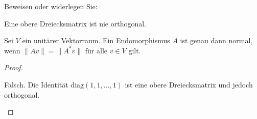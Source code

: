 \begin{Problem}
	Beweisen oder widerlegen Sie:
	\begin{parts}
	\item Eine obere Dreiecksmatrix ist nie orthogonal.
	\item Sei $V$ ein unitärer Vektorraum. Ein Endomorphismus $A$ ist genau dann normal, wenn $\|Av\|=\|A^*v\|$ f\"{u}r alle $v\in V$ gilt.  
	\end{parts}
\end{Problem}

\begin{proof}
	\begin{parts}
	\item Falsch. Die Identität $\text{diag}(1,1,\dots, 1)$ ist eine obere Dreiecksmatrix und jedoch orthogonal.
	\end{parts}
\end{proof}

